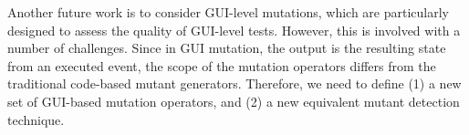 Another future work is to consider GUI-level mutations, which are particularly designed to assess the quality of GUI-level tests. However, this is involved with a number of challenges. Since in GUI mutation, the output is the resulting state from an executed event, the scope of the mutation operators differs from the traditional code-based mutant generators. Therefore, we need to define (1) a new set of GUI-based mutation operators, and (2) a new equivalent mutant detection technique.
  




